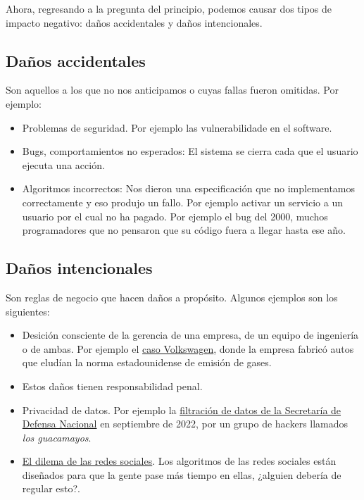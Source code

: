 \documentclass[twoside]{article}
\begin{document}
\begin{multicols}{2}
Ahora, regresando a la pregunta del principio, podemos causar dos tipos de
impacto negativo: daños accidentales y daños intencionales.

\subsection{Daños accidentales}

Son aquellos a los que no nos anticipamos o cuyas fallas fueron omitidas. Por
ejemplo:

\begin{itemize}
\item Problemas de seguridad. Por ejemplo las vulnerabilidade en el software.
\item Bugs, comportamientos no esperados: El sistema se cierra cada que el
usuario ejecuta una acción.
\item Algoritmos incorrectos: Nos dieron una especificación que no implementamos
correctamente y eso produjo un fallo. Por ejemplo activar un servicio a un
usuario por el cual no ha pagado. Por ejemplo el bug del 2000, muchos
programadores que no pensaron que su código fuera a llegar hasta ese año.
\end{itemize}

\subsection{Daños intencionales}

Son reglas de negocio que hacen daños a propósito. Algunos ejemplos son los
siguientes:

\begin{itemize}
\item Desición consciente de la gerencia de una empresa, de un equipo de
ingeniería o de ambas. Por ejemplo el
\href{https://repositorio.comillas.edu/rest/bitstreams/295635/retrieve}{caso
Volkswagen}, donde la empresa fabricó autos que eludían la norma estadounidense
de emisión de gases.
\item Estos daños tienen responsabilidad penal.
\item Privacidad de datos. Por ejemplo la
\href{https://elpais.com/mexico/2022-10-01/una-masiva-filtracion-expone-el-poder-del-ejercito-mexicano-en-la-vida-publica.html}{filtración
de datos de la Secretaría de Defensa Nacional} en septiembre de 2022, por un
grupo de hackers llamados \textit{los guacamayos}.
\item
\href{https://www.netflix.com/es/title/81254224#:~:text=Este%20documental%20dramatizado%20analiza%20la,las%20herramientas%20creadas%20por%20ellos.&text=Ve%20todo%20lo%20que%20quieras.&text=De%20Jeff%20Orlowski%2C%20director%20del,'%2C%20ganador%20del%20premio%20Emmy.}
{El dilema de las redes sociales}. Los algoritmos de las redes sociales
están diseñados para que la gente pase más tiempo en ellas, ¿alguien debería de
regular esto?.
\end{itemize}


\end{multicols}
\end{document}
